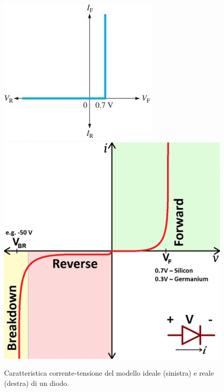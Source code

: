 \begin{figure}[h]
	\centering
	\includegraphics[width=0.3\linewidth]{./ImageFiles/Laboratorio 2/diodo_2}
	\includegraphics[width=0.3\linewidth]{./ImageFiles/Laboratorio 2/diodo_3}
	\caption{Caratteristica corrente-tensione del modello ideale (sinistra) e reale (destra) di un diodo.}
	\label{fig:diodo_caratteristica}
\end{figure}

